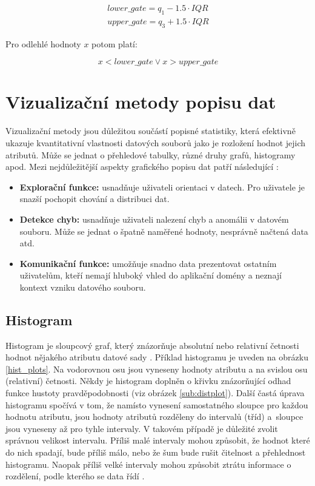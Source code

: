 \begin{gather}
    lower\_gate = q_1-1.5 \cdot IQR \\
    upper\_gate = q_3+1.5 \cdot IQR
\end{gather}

\noindent Pro odlehlé hodnoty $x$ potom platí:

\begin{equation}
    x < lower\_gate \lor x > upper\_gate
\end{equation}



\section{Vizualizační metody popisu dat}
\label{charts}



Vizualizační metody jsou důležitou součástí popisné statistiky, která efektivně ukazuje kvantitativní vlastnosti datových souborů jako je rozložení hodnot jejich atributů. Může se jednat o přehledové tabulky, různé druhy grafů, histogramy apod. Mezi nejdůležitější aspekty grafického popisu dat patří následující \cite{skiena}:

\begin{itemize}
    \item \textbf{Explorační funkce:} usnadňuje uživateli orientaci v datech. Pro uživatele je snazší pochopit chování a distribuci dat.
    \item \textbf{Detekce chyb:} usnadňuje uživateli nalezení chyb a anomálii v datovém souboru. Může se jednat o špatně naměřené hodnoty, nesprávně načtená data atd.
    \item \textbf{Komunikační funkce:} umožňuje snadno data prezentovat ostatním uživatelům, kteří nemají hluboký vhled do aplikační domény a neznají kontext vzniku datového souboru.
\end{itemize}

\subsection*{Histogram}

Histogram je sloupcový graf, který znázorňuje absolutní nebo relativní četnosti hodnot nějakého atributu datové sady \cite{zahora}. Příklad histogramu je uveden na obrázku \ref{hist_plots}. Na vodorovnou osu jsou vyneseny hodnoty atributu a na svislou osu (relativní) četnosti. Někdy je histogram doplněn o křivku znázorňující odhad funkce hustoty pravděpodobnosti (viz obrázek \ref{sub:distplot}). Další častá úprava histogramu spočívá v tom, že namísto vynesení samostatného sloupce pro každou hodnotu atributu, jsou hodnoty atributů rozděleny do intervalů (tříd) a~sloupce jsou vyneseny až pro tyhle intervaly. V takovém případě je důležité zvolit správnou velikost intervalu. Příliš malé intervaly mohou způsobit, že hodnot které do nich spadají, bude příliš málo, nebo že šum bude rušit čitelnost a přehlednost histogramu. Naopak příliš velké intervaly mohou způsobit ztrátu informace o rozdělení, podle kterého se data řídí \cite{skiena}. 

